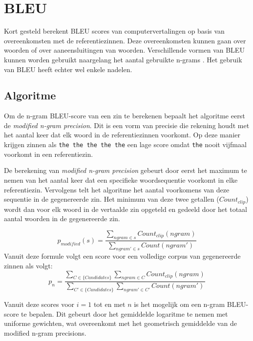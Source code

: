 \section{BLEU}
Kort gesteld berekent BLEU scores van computervertalingen op basis van overeenkomsten met de referentiezinnen. Deze overeenkomsten kunnen gaan over woorden of over aaneensluitingen van woorden. Verschillende vormen van BLEU kunnen worden gebruikt naargelang het aantal gebruikte n-grams . Het gebruik van BLEU heeft echter wel enkele nadelen.

\subsection{Algoritme}
Om de n-gram BLEU-score van een zin te berekenen bepaalt het algoritme eerst de \textit{modified n-gram precision}. Dit is een vorm van precisie die rekening houdt met het aantal keer dat elk woord in de referentiezinnen voorkomt. Op deze manier krijgen zinnen als \texttt{the the the the the} een lage score omdat \texttt{the} nooit vijfmaal voorkomt in een referentiezin. 

De berekening van \textit{modified n-gram precision} gebeurt door eerst het maximum te nemen van het aantal keer dat een specifieke woordsequentie voorkomt in elke referentiezin. Vervolgens telt het algoritme het aantal voorkomens van deze sequentie in de gegenereerde zin. Het minimum van deze twee getallen ($Count_ {clip}$) wordt dan voor elk woord in de vertaalde zin opgeteld en gedeeld door het totaal aantal woorden in de gegenereerde zin.

\begin{equation}
p_{modified}(s) =
\frac{\sum\limits_{ngram \in s} Count_{clip}(ngram)}{\sum\limits_{ngram' \in s} Count(ngram')}
\label{formule:ngramprecision}
\end{equation}
Vanuit deze formule volgt een score voor een volledige corpus van gegenereerde zinnen als volgt:
\begin{equation}
p_{n} =
\frac{\sum\limits_{C \in \{Candidates\} } \sum\limits_{ngram \in C} Count_{clip}(ngram)}{\sum\limits_{C' \in \{Candidates\} } \sum\limits_{ngram' \in C'} Count(ngram')}
\label{formule:corpus_modified}
\end{equation}

Vanuit deze scores voor $i=1$ tot en met $n$ is het mogelijk om een n-gram BLEU-score te bepalen. Dit gebeurt door het gemiddelde logaritme te nemen met uniforme gewichten, wat overeenkomt met het geometrisch gemiddelde van de modified n-gram precisions.

